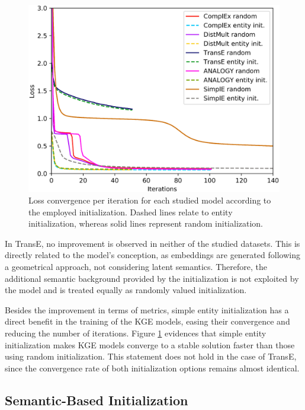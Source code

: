 \begin{figure}[t]
    \centering
    \includegraphics[width=.8\linewidth]{4_kbsintegrationdl/figures/ConvergenceDetail.eps}
    \caption{Loss convergence per iteration for each studied model according to the employed initialization. Dashed lines relate to entity initialization, whereas solid lines represent random initialization.}
    \label{fig:convergence}
\end{figure}


In TransE, no improvement is observed in neither of the studied datasets. This is directly related to the model's conception, as embeddings are generated following a geometrical approach, not considering latent semantics. Therefore, the additional semantic background provided by the initialization is not exploited by the model and is treated equally as randomly valued initialization.

Besides the improvement in terms of metrics, simple entity initialization has a direct benefit in the training of the KGE models, easing their convergence and reducing the number of iterations. Figure \ref{fig:convergence} evidences that simple entity initialization makes KGE models converge to a stable solution faster than those using random initialization. This statement does not hold in the case of TransE, since the convergence rate of both initialization options remains almost identical.

\subsection{Semantic-Based Initialization}

